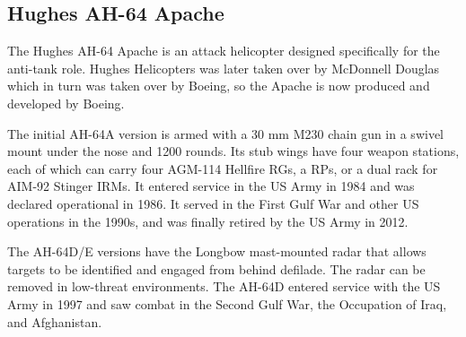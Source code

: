
\subsection{Hughes AH-64 Apache}

The Hughes AH-64 Apache is an attack helicopter designed specifically for the anti-tank role. Hughes Helicopters was later taken over by McDonnell Douglas which in turn was taken over by Boeing, so the Apache is now produced and developed by Boeing.

The initial AH-64A version is armed with a 30 mm M230 chain gun in a swivel mount under the nose and 1200 rounds. Its stub wings have four weapon stations, each of which can carry four AGM-114 Hellfire RGs, a  RPs, or a dual rack for AIM-92 Stinger IRMs. It entered service in the US Army in 1984 and was declared operational in 1986. It served in the First Gulf War and other US operations in the 1990s, and was finally retired by the US Army in 2012.

The AH-64D/E versions have the Longbow mast-mounted radar that allows targets to be identified and engaged from behind defilade. The radar can be removed in low-threat environments. The AH-64D entered service with the US Army in 1997 and saw combat in the Second Gulf War, the Occupation of Iraq, and Afghanistan.
